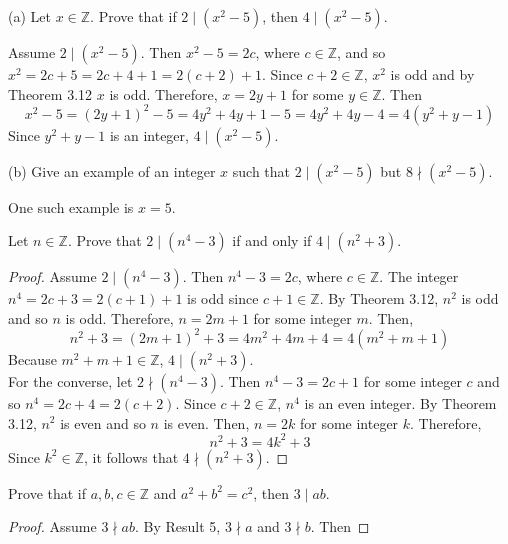 \documentclass[12pt]{article}
\newcommand{\Z}{\mathbb{Z}}
\newenvironment{problem}[2][Problem]{\begin{trivlist}
		\item[\hskip \labelsep {\bfseries #1}\hskip \labelsep {\bfseries #2.}]}{\end{trivlist}}
\newenvironment{solution}[2][Solution]{\begin{trivlist}
		\item[\hskip \labelsep {\bfseries #1}\hskip \labelsep {\bfseries #2.}]}{\end{trivlist}}
\begin{document}
	\begin{problem}{9}
		(a) Let $x\in \Z$. Prove that if $2 \mid (x^{2}-5)$, then $4\mid (x^{2}-5)$.
		\begin{solution}{a}
			Assume $2 \mid (x^{2}-5)$. Then $x^{2}-5=2c$, where $c\in \Z$, and so $x^{2} = 2c+5 = 2c+4+1=2(c+2)+1$. Since $c+2\in \Z$, $x^{2}$ is odd and by Theorem 3.12 $x$ is odd. Therefore, $x=2y+1$ for some $y\in \Z$. Then
			\begin{equation*}
				x^{2}-5 = (2y+1)^{2}-5 = 4y^{2}+4y +1 -5 = 4y^{2}+4y-4= 4(y^{2}+y-1)
			\end{equation*}
		Since $y^{2}+y-1$ is an integer, $4\mid (x^{2}-5)$.
		\end{solution}
		(b) Give an example of an integer $x$ such that $2\mid (x^{2}-5)$ but $8\nmid (x^{2}-5)$.
		\begin{solution}{b}
			One such example is $x=5$.
		\end{solution}
	\end{problem}

	\begin{problem}{10}
		Let $n\in \Z$. Prove that $2\mid (n^{4}-3)$ if and only if $4\mid (n^{2}+3)$.
		\begin{proof}
			Assume $2\mid (n^{4}-3)$. Then $n^{4} -3=2c$, where $c\in \Z$. The integer $n^{4}=2c+3=2(c+1)+1$ is odd since $c+1\in \Z$. By Theorem 3.12, $n^{2}$ is odd and so $n$ is odd. Therefore, $n=2m+1$ for some integer $m$. Then,
			\begin{equation*}
				n^{2}+3 = (2m+1)^{2}+3 = 4m^{2}+4m+4 = 4(m^{2}+m+1)
			\end{equation*}
			Because $m^{2}+m+1\in \Z$, $4\mid (n^{2}+3)$. \\
			For the converse, let $2 \nmid (n^{4}-3)$. Then $n^{4}-3 = 2c+1$ for some integer $c$ and so $n^{4} = 2c+4= 2(c+2)$. Since $c+2\in \Z$, $n^4$ is an even integer. By Theorem 3.12, $n^{2}$ is even and so $n$ is even. Then, $n=2k$ for some integer $k$. Therefore,
			\begin{equation*}
				n^{2}+3 = 4k^{2}+3
			\end{equation*}
			Since $k^{2}\in \Z$, it follows that $4\nmid (n^{2}+3)$.
		\end{proof}
	\end{problem}

	\begin{problem}{13}
		Prove that if $a,b,c\in \Z$ and $a^{2}+b^{2}=c^{2}$, then $3\mid ab$.
		\begin{proof}
			Assume $3\nmid ab$. By Result 5, $3 \nmid a$ and $3 \nmid b$. Then
		\end{proof}
	\end{problem}
\end{document}
